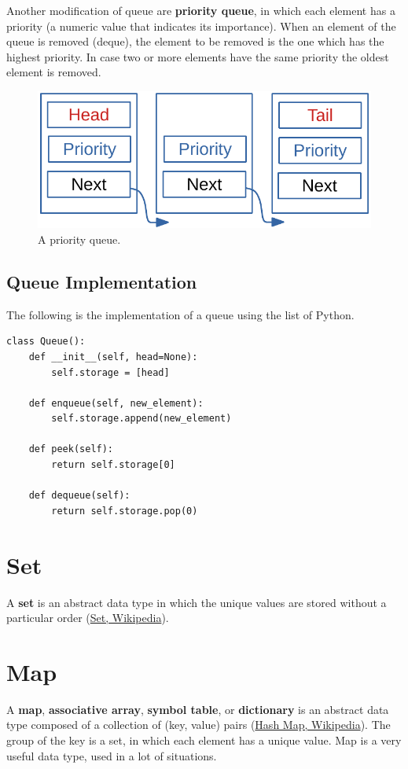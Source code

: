Another modification of queue are \textbf{priority queue}, in which each element has a priority (a numeric value that indicates its importance). When an element of the queue is removed (deque), the element to be removed is the one which has the highest priority. In case two or more elements have the same priority the oldest element is removed.

\begin{figure}[H]
	\begin{center}
		\includegraphics[scale=.6]{chapters/datastructures/images/queue_3.pdf}
		\caption[A priority queue.]{A priority queue.}
		\label{queue_3}
	\end{center}
\end{figure}

\subsection{Queue Implementation}
The following is the implementation of a queue using the list of Python.
\begin{lstlisting}[firstnumber=1, caption={Queue implementation.}]
class Queue():
	def __init__(self, head=None):
		self.storage = [head]
	
	def enqueue(self, new_element):
		self.storage.append(new_element)
	
	def peek(self):
		return self.storage[0]
	
	def dequeue(self):
		return self.storage.pop(0)
\end{lstlisting}

\section{Set}
A \textbf{set} is an abstract data type in which the unique values are stored without a particular order \cite{wikiset} (\href{https://en.wikipedia.org/wiki/Set_(abstract_data_type)}{Set, Wikipedia}).

\section{Map}
A \textbf{map}, \textbf{associative array}, \textbf{symbol table}, or \textbf{dictionary} is an abstract data type composed of a collection of (key, value) pairs \cite{wikihashmap} (\href{https://en.wikipedia.org/wiki/Associative_array}{Hash Map, Wikipedia}). The group of the key is a set, in which each element has a unique value. Map is a very useful data type, used in a lot of situations. 


